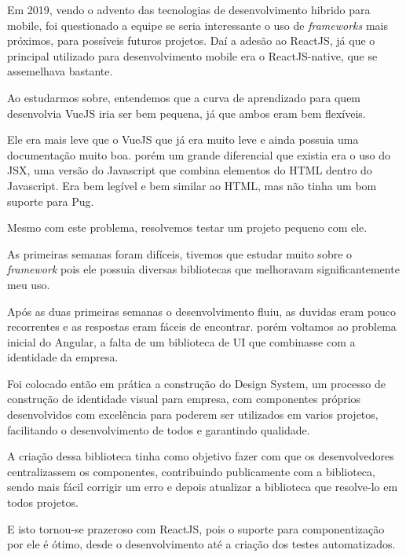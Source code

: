 Em 2019, vendo o advento das tecnologias de desenvolvimento hibrido para mobile, foi questionado a equipe se seria interessante o uso de \textit{frameworks} mais próximos, para possíveis futuros projetos.
Daí a adesão ao ReactJS, já que o principal utilizado para desenvolvimento mobile era o ReactJS-native, que se assemelhava bastante.

Ao estudarmos sobre, entendemos que a curva de aprendizado para quem desenvolvia VueJS iria ser bem pequena, já que ambos eram bem flexíveis.

Ele era mais leve que o VueJS que já era muito leve e ainda possuia uma documentação muito boa.
porém um grande diferencial que existia era o uso do JSX, uma versão do Javascript que combina elementos do HTML dentro do Javascript. Era bem legível e bem similar ao HTML, mas não tinha um bom suporte para Pug.

Mesmo com este problema, resolvemos testar um projeto pequeno com ele. 

As primeiras semanas foram difíceis, tivemos que estudar muito sobre o \textit{framework} pois ele possuia diversas bibliotecas que melhoravam significantemente meu uso.

Após as duas primeiras semanas o desenvolvimento fluiu, as duvidas eram pouco recorrentes e as respostas eram fáceis de encontrar. porém voltamos ao problema inicial do Angular, 
a falta de um biblioteca de UI que combinasse com a identidade da empresa.

Foi colocado então em prática a construção do Design System, um processo de construção de identidade visual para empresa, com componentes próprios desenvolvidos com excelência para poderem ser utilizados em varios projetos, facilitando o desenvolvimento de todos e garantindo qualidade.

A criação dessa biblioteca tinha como objetivo fazer com que os desenvolvedores centralizassem os componentes, contribuindo publicamente com a biblioteca, sendo mais fácil corrigir um erro e depois atualizar a biblioteca que resolve-lo em todos projetos.

E isto tornou-se prazeroso com ReactJS, pois o suporte para componentização por ele é ótimo, desde o desenvolvimento até a criação dos testes automatizados.
